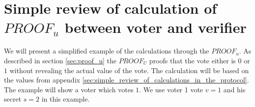 \section{Simple review of calculation of $PROOF_u$ between voter and verifier}
\label{sec:simple_review_of_calculation_of_proof_u_between_voter_and_verifier}
We will present a simplified example of the calculations through the $PROOF_u$. As described in section  \ref{sec:proof_u} the $PROOF_U$ proofs that the vote  either is $0$ or $1$ without revealing the actual value of the vote. The calculation will be based on the values  from appendix \ref{sec:simple_review_of_calculations_in_the_protocol}. The example will show a voter which votes $1$. We use voter 1 vote $v=1$ and his secret $s=2$ in this example.


